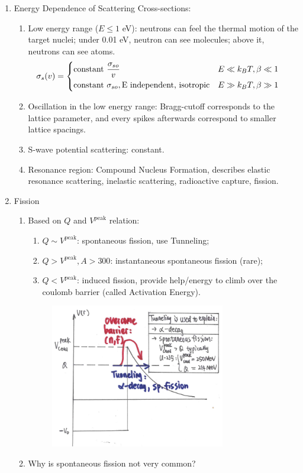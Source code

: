 \documentclass{school-22.101-notes}
\begin{document}
\begin{enumerate}
\item Energy Dependence of Scattering Cross-sections:
\begin{enumerate}
\item Low energy range ($E \le 1$ eV): neutrons can feel the thermal motion of the target nuclei; under 0.01 eV, neutron can see molecules; above it, neutrons can see atoms.
    \begin{align}
    \sigma_s (v) &= 
    \begin{dcases*}
    \mbox{constant } \frac{\sigma_{so}}{v}& $E \ll k_B T, \beta \ll 1$ \\
    \mbox{constant } \sigma_{so}, \mbox{E independent, isotropic} & $E \gg k_B T, \beta \gg 1$ 
    \end{dcases*} 
    \end{align}
\item Oscillation in the low energy range: Bragg-cutoff corresponds to the lattice parameter, and every spikes afterwards correspond to smaller lattice spacings. 
\item S-wave potential scattering: constant.
\item Resonance region: Compound Nucleus Formation, describes elastic resonance scattering, inelastic scattering, radioactive capture, fission. 
\end{enumerate}

\item Fission
\begin{enumerate}
\item Based on $Q$ and $V^{\mathrm{peak}}$ relation:
    \begin{enumerate}
    \item $Q \sim V^{\mathrm{peak}}$: spontaneous fission, use Tunneling; 
    \item $Q > V^{\mathrm{peak}}, A>300$: instantaneous spontaneous fission (rare);
    \item $Q < V^{\mathrm{peak}}$: induced fission, provide help/energy to climb over the coulomb barrier (called Activation Energy). 
    \end{enumerate}
    \begin{figure}[ht]
       \centering
       \includegraphics[width=3in]{images/ni/fission-mechanism.png}
    \end{figure}
\item Why is spontaneous fission not very common? 


\end{enumerate}
\end{enumerate}
\end{document}
